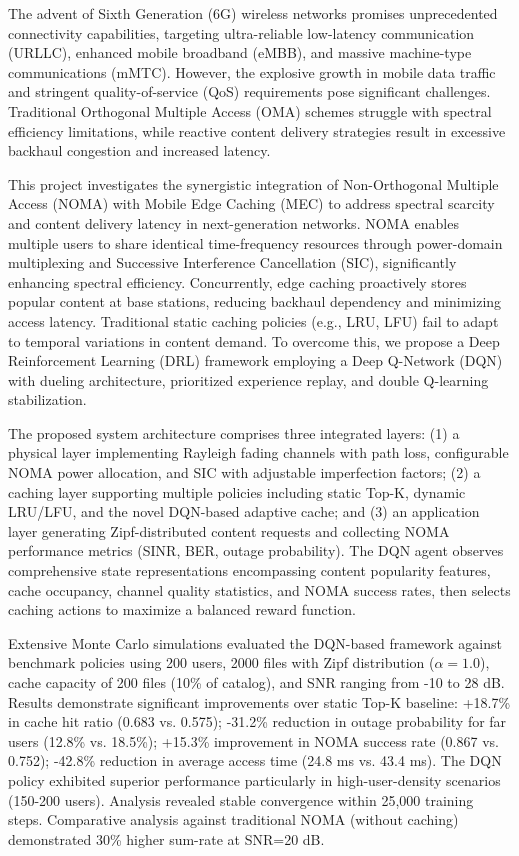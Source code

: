 \documentclass[12pt,a4paper]{article}
\begin{document}
\begin{singlespace}
\noindent
The advent of Sixth Generation (6G) wireless networks promises unprecedented connectivity capabilities, targeting ultra-reliable low-latency communication (URLLC), enhanced mobile broadband (eMBB), and massive machine-type communications (mMTC). However, the explosive growth in mobile data traffic and stringent quality-of-service (QoS) requirements pose significant challenges. Traditional Orthogonal Multiple Access (OMA) schemes struggle with spectral efficiency limitations, while reactive content delivery strategies result in excessive backhaul congestion and increased latency.

This project investigates the synergistic integration of Non-Orthogonal Multiple Access (NOMA) with Mobile Edge Caching (MEC) to address spectral scarcity and content delivery latency in next-generation networks. NOMA enables multiple users to share identical time-frequency resources through power-domain multiplexing and Successive Interference Cancellation (SIC), significantly enhancing spectral efficiency. Concurrently, edge caching proactively stores popular content at base stations, reducing backhaul dependency and minimizing access latency. Traditional static caching policies (e.g., LRU, LFU) fail to adapt to temporal variations in content demand. To overcome this, we propose a Deep Reinforcement Learning (DRL) framework employing a Deep Q-Network (DQN) with dueling architecture, prioritized experience replay, and double Q-learning stabilization.

The proposed system architecture comprises three integrated layers: (1) a physical layer implementing Rayleigh fading channels with path loss, configurable NOMA power allocation, and SIC with adjustable imperfection factors; (2) a caching layer supporting multiple policies including static Top-K, dynamic LRU/LFU, and the novel DQN-based adaptive cache; and (3) an application layer generating Zipf-distributed content requests and collecting NOMA performance metrics (SINR, BER, outage probability). The DQN agent observes comprehensive state representations encompassing content popularity features, cache occupancy, channel quality statistics, and NOMA success rates, then selects caching actions to maximize a balanced reward function.

Extensive Monte Carlo simulations evaluated the DQN-based framework against benchmark policies using 200 users, 2000 files with Zipf distribution ($\alpha=1.0$), cache capacity of 200 files (10\% of catalog), and SNR ranging from -10 to 28 dB. Results demonstrate significant improvements over static Top-K baseline: +18.7\% in cache hit ratio (0.683 vs. 0.575); -31.2\% reduction in outage probability for far users (12.8\% vs. 18.5\%); +15.3\% improvement in NOMA success rate (0.867 vs. 0.752); -42.8\% reduction in average access time (24.8 ms vs. 43.4 ms). The DQN policy exhibited superior performance particularly in high-user-density scenarios (150-200 users). Analysis revealed stable convergence within 25,000 training steps. Comparative analysis against traditional NOMA (without caching) demonstrated 30\% higher sum-rate at SNR=20 dB.


\end{singlespace}
\end{document}
